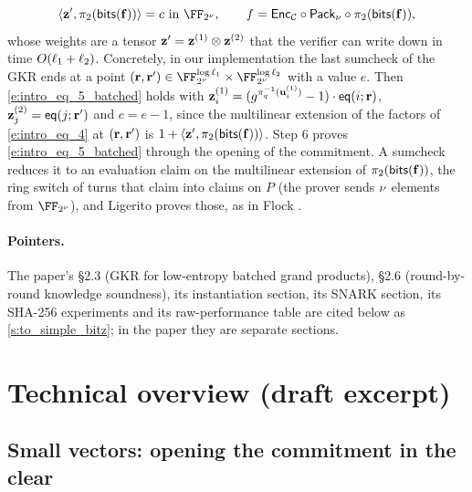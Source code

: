 \documentclass[11pt,letterpaper,usenames,dvipsnames]{article}
\begin{document}
%
\begin{equation}\label{e:intro_eq_5_batched}\langle \zz', \pi_2(\bitstext(\bff)) \rangle = c \ \text{in  } \comfield, \qquad f = \Enc_\cC\circ \pack \circ \pi_2(\bitstext(\bff)),
\end{equation}
%
whose weights are a tensor $\mathbf{z}'=\mathbf{z}^{(1)}\otimes\mathbf{z}^{(2)}$ that the verifier can write down in time $O(\ell_1+\ell_2)$. Concretely, in our implementation the last sumcheck of the GKR ends at a point $(\rr,\rr')\in\comfield^{\log\codedim_1}\times\comfield^{\log\codedim_2}$ with a value $e$. Then \eqref{e:intro_eq_5_batched} holds with $\mathbf{z}^{(1)}_i=(g^{\pi_q^{-1}(\mathbf{u}_i^{(1)})}-1)\cdot\mathsf{eq}(i;\mathbf{r})$, $\mathbf{z}^{(2)}_j=\mathsf{eq}(j;\mathbf{r}')$ and $c=e-1$, since the multilinear extension of the factors of \eqref{e:intro_eq_4} at $(\mathbf{r},\mathbf{r}')$ is $1+\langle\mathbf{z}',\pi_2(\mathsf{bits}(\mathbf{f}))\rangle$. Step 6 proves \eqref{e:intro_eq_5_batched} through the opening of the commitment. A sumcheck reduces it to an evaluation claim on the multilinear extension of $\pi_2(\mathsf{bits}(\mathbf{f}))$, the ring switch of \cite{binius2} turns that claim into claims on $P$ (the prover sends $\nu$ elements from $\comfield$), and Ligerito \cite{Ligerito} proves those, as in Flock \cite{flock}.

\paragraph{Pointers.}\label{s:to_low_entropy_gkr} The paper's \S2.3 (GKR for low-entropy batched grand products), \S2.6 (round-by-round knowledge soundness), its instantiation section, its SNARK section, its SHA-256 experiments and its raw-performance table are cited below as \cref{s:to_simple_bitz}; in the paper they are separate sections.\label{s:to_soundness_prime}\label{s:instantiation}\label{c:core_iop}\label{t:thm_core_IOPP}\label{s:to_snark}\label{s:to_f2_virtual}\label{s:experiments_sha}\label{tab:f2z-raw-performance}

\section{Technical overview (draft excerpt)}

\subsection{Small vectors: opening the commitment in the clear}\label{s:to_clear}
\end{document}
